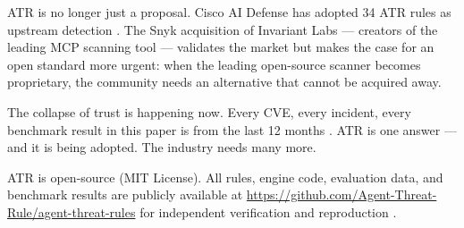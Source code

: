 \documentclass[11pt,letterpaper]{article}
\begin{document}
ATR is no longer just a proposal. Cisco AI Defense has adopted 34 ATR rules as upstream detection \cite{ciscopr79}. The Snyk acquisition of Invariant Labs \cite{snykinvariant} --- creators of the leading MCP scanning tool --- validates the market but makes the case for an open standard more urgent: when the leading open-source scanner becomes proprietary, the community needs an alternative that cannot be acquired away.

The collapse of trust is happening now. Every CVE, every incident, every benchmark result in this paper is from the last 12 months \cite{cve6514,cve53773,cvegit,cve49596,sandworm,postmark,minja,servicenow,aixbt}. ATR is one answer --- and it is being adopted. The industry needs many more.

ATR is open-source (MIT License). All rules, engine code, evaluation data, and benchmark results are publicly available at \url{https://github.com/Agent-Threat-Rule/agent-threat-rules} for independent verification and reproduction \cite{atr}.
\end{document}
